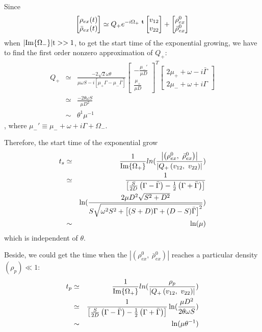 \documentclass[aps,prd,twocolumn,amsmath,amssymb,groupedaddress]{revtex4-2}
\begin{document}
Since 
\begin{eqnarray}
	\begin{bmatrix}
		\rho_{ex} (t)\\ \bar{\rho}_{ex} (t)
	\end{bmatrix}
	\simeq
	Q_+e^{-i \Omega_{+} ~\bf{t}}
	\begin{bmatrix}
		v_{12}  \\ v_{22}
	\end{bmatrix} + 
	\begin{bmatrix} 
		\rho^0_{ex} \\ \bar{\rho}^0_{ex}
	\end{bmatrix}
\end{eqnarray}
when $|\rm{Im}\{\Omega_-\}| t>>1$, to get the start time of the exponential growing, we have to find the first order nonzero approximation of $Q_+$:
\begin{eqnarray}
	Q_+	&\simeq&
	\frac{-2\sqrt{2}\omega \theta}{\mu \omega S - i \left[\mu_+ \Gamma - \mu_- \bar{\Gamma} \right]}
	\begin{bmatrix}
		-\frac{\mu_-'}{\mu D} \\ \frac{\mu_+}{\mu D}
	\end{bmatrix}^T
	\begin{bmatrix}
		2\mu_+ + \omega - i \bar{\Gamma} \\ 2\mu_- + \omega + i \Gamma
	\end{bmatrix} \nonumber \\
	&\simeq&
	\frac{-2 \theta\omega S}{\mu D^2}\\
	&\sim&
	\theta^1 \mu^{-1}
\end{eqnarray}, where $\mu_-' \equiv \mu_- + \omega + i \Gamma + \Omega_-$.

Therefore, the start time of the exponential grow
\begin{eqnarray}
	t_s	&\simeq& 
	\frac{1}{\rm{Im}\{\Omega_+\}}ln(\frac{\left| \left(\rho^0_{ex}, ~\bar{\rho}^0_{ex}\right) \right|}{\left|Q_+\left(v_{12}, ~ v_{22}\right)\right|})	\nonumber \\
	&\simeq&
	\frac{1}{\left[\frac{S}{2D}\left(\Gamma-\bar{\Gamma}\right)-\frac{1}{2}\left(\Gamma+\bar{\Gamma}\right)\right]} \nonumber \\
	&&\ln(\frac{2\mu D^2\sqrt{S^2+D^2}}{S\sqrt{\omega^2S^2+\left[(S+D) \Gamma + (D-S) \bar{\Gamma}\right]^2}}) \\
	&\sim& \ln(\mu)
\end{eqnarray}
which is independent of $\theta$.

Beside, we could get the time when the $\left| \left(\rho^0_{ex}, ~\bar{\rho}^0_{ex}\right) \right|$ reaches a particular density $(\rho_{p}) \ll 1$:
\begin{eqnarray}
	t_{p}	&\simeq& 
	\frac{1}{\rm{Im}\{\Omega_+\}}ln(\frac{\rho_{p}}{\left|Q_+\left(v_{12}, ~ v_{22}\right)\right|})	\nonumber \\
	&\simeq&
	\frac{1}{\left[\frac{S}{2D}\left(\Gamma-\bar{\Gamma}\right)-\frac{1}{2}\left(\Gamma+\bar{\Gamma}\right)\right]} \ln(\frac{\mu D^2}{2\theta \omega S}) \\
	&\sim& \ln(\mu \theta^{-1})
\end{eqnarray}
\end{document}

